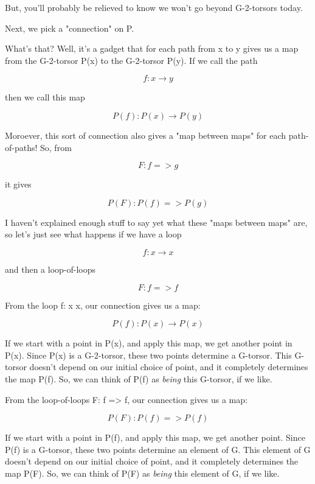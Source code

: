 But, you'll probably be relieved to know we won't go beyond G-2-torsors 
today.

Next, we pick a "connection" on P.  

What's that?  Well, it's a gadget that for each path from x to y
gives us a map from the G-2-torsor P(x) to the G-2-torsor P(y).
If we call the path


$$

f: x \to  y
$$
    
then we call this map


$$

P(f): P(x) \to  P(y)
$$
    

Moroever, this sort of connection also gives a "map between
maps" for each path-of-paths!  So, from


$$

F: f => g
$$
    
it gives


$$

P(F): P(f) => P(g)
$$
    
I haven't explained enough stuff to say yet what these "maps between
maps" are, so let's just see what happens if we have a loop 


$$

f: x \to  x
$$
    
and then a loop-of-loops 


$$

F: f => f
$$
    
From the loop f: x \to  x, our connection gives us a map:


$$

P(f): P(x) \to  P(x)
$$
    
If we start with a point in P(x), and apply this map, we get another 
point in P(x).  Since P(x) is a G-2-torsor, these two points determine a 
G-torsor.  This G-torsor doesn't depend on our initial choice of 
point, and it completely determines the map P(f).   So, we can think 
of P(f) as \emph{being} this G-torsor, if we like.

From the loop-of-loops F: f => f, our connection gives us a map:


$$

P(F): P(f) => P(f)
$$
    
If we start with a point in P(f), and apply this map, we get 
another point.  Since P(f) is a G-torsor, these two points determine an 
element of G.  This element of G doesn't depend on our initial choice 
of point, and it completely determines the map P(F).   So, 
we can think of P(F) as \emph{being} this element of G, if we like.

